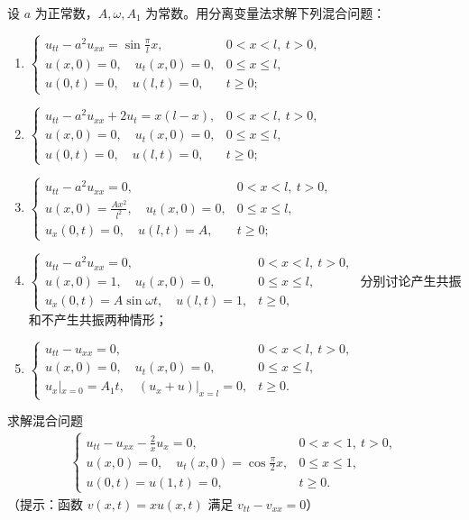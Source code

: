 \documentclass[../../main.tex]{subfiles}%
\begin{document}
\begin{example}
设 $a$ 为正常数，$A,\omega,A_1$ 为常数。用分离变量法求解下列混合问题：
\begin{enumerate}[(1)]
\item $\begin{cases}
u_{tt}-a^2u_{xx}=\sin\frac{\pi}{l}x, & 0<x<l,\ t>0, \\
u(x,0)=0,\quad u_t(x,0)=0, & 0\leqslant x\leqslant l, \\
u(0,t)=0,\quad u(l,t)=0, & t\geqslant 0;
\end{cases}$
\item $\begin{cases}
u_{tt}-a^2u_{xx}+2u_t=x(l-x), & 0<x<l,\ t>0, \\
u(x,0)=0,\quad u_t(x,0)=0, & 0\leqslant x\leqslant l, \\
u(0,t)=0,\quad u(l,t)=0, & t\geqslant 0;
\end{cases}$
\item $\begin{cases}
u_{tt}-a^2u_{xx}=0, & 0<x<l,\ t>0, \\
u(x,0)=\frac{Ax^2}{l^2},\quad u_t(x,0)=0, & 0\leqslant x\leqslant l, \\
u_x(0,t)=0,\quad u(l,t)=A, & t\geqslant 0;
\end{cases}$
\item $\begin{cases}
u_{tt}-a^2u_{xx}=0, & 0<x<l,\ t>0, \\
u(x,0)=1,\quad u_t(x,0)=0, & 0\leqslant x\leqslant l, \\
u_x(0,t)=A\sin\omega t,\quad u(l,t)=1, & t\geqslant 0,
\end{cases}$
分别讨论产生共振和不产生共振两种情形；
\item $\begin{cases}
u_{tt}-u_{xx}=0, & 0<x<l,\ t>0, \\
u(x,0)=0,\quad u_t(x,0)=0, & 0\leqslant x\leqslant l, \\
u_x|_{x=0}=A_1t,\quad (u_x+u)|_{x=l}=0, & t\geqslant 0.
\end{cases}$
\end{enumerate}
\end{example}

\begin{example}
求解混合问题
\begin{align*}
\begin{cases}
u_{tt}-u_{xx}-\frac{2}{x}u_x=0, & 0<x<1,\ t>0, \\
u(x,0)=0,\quad u_t(x,0)=\cos\frac{\pi}{2}x, & 0\leqslant x\leqslant 1, \\
u(0,t)=u(1,t)=0, & t\geqslant 0.
\end{cases}
\end{align*}
（提示：函数 $v(x,t)=xu(x,t)$ 满足 $v_{tt}-v_{xx}=0$）
\end{example}
\end{document}
